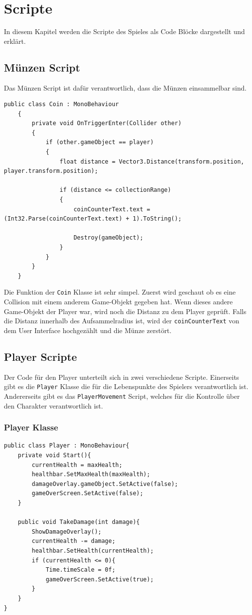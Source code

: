 \pagebreak
\chapter{Scripte}
In diesem Kapitel werden die Scripte des Spieles als Code Blöcke dargestellt und erklärt. 

\section{Münzen Script}
Das Münzen Script ist dafür verantwortlich, dass die Münzen einsammelbar sind. 
\begin{lstlisting}[language=CSharp,caption={Coin Klasse.},label=code:coin]
    public class Coin : MonoBehaviour
    {
        private void OnTriggerEnter(Collider other)
        {
            if (other.gameObject == player)
            {
                float distance = Vector3.Distance(transform.position, player.transform.position);
                
                if (distance <= collectionRange)
                {
                    coinCounterText.text = (Int32.Parse(coinCounterText.text) + 1).ToString();
                    
                    Destroy(gameObject);
                }
            }
        }
    }
\end{lstlisting}   

Die Funktion der \verb+Coin+ Klasse ist sehr simpel. Zuerst wird geschaut ob es eine Collision mit einem anderem Game-Objekt gegeben hat. Wenn dieses andere Game-Objekt der Player war, wird noch die Distanz zu dem Player geprüft. Falls die Distanz innerhalb des Aufsammelradius ist, wird der \verb+coinCounterText+ von dem User Interface hochgezählt und die Münze zerstört.


\pagebreak
\section{Player Scripte}
Der Code für den Player unterteilt sich in zwei verschiedene Scripte. Einerseits gibt es die \verb+Player+ Klasse die für die Lebenspunkte des Spielers verantwortlich ist. Andererseits gibt es das \verb+PlayerMovement+ Script, welches für die Kontrolle über den Charakter verantwortlich ist. \\

\subsection{Player Klasse}
\begin{lstlisting}[language=CSharp,caption={Player Klasse.},label=code:player]
public class Player : MonoBehaviour{
    private void Start(){
        currentHealth = maxHealth;
        healthbar.SetMaxHealth(maxHealth);
        damageOverlay.gameObject.SetActive(false);
        gameOverScreen.SetActive(false);
    }

    public void TakeDamage(int damage){
        ShowDamageOverlay();
        currentHealth -= damage;
        healthbar.SetHealth(currentHealth);
        if (currentHealth <= 0){
            Time.timeScale = 0f;
            gameOverScreen.SetActive(true);
        }
    }
}
\end{lstlisting}

